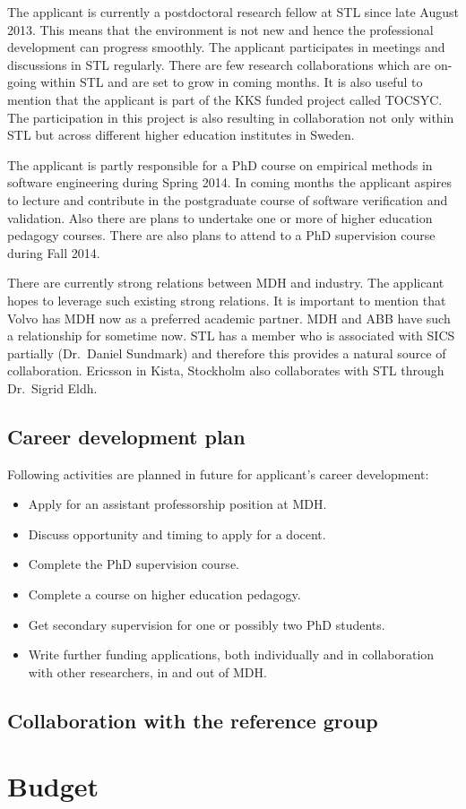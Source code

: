 \documentclass[11pt, oneside]{article}   	%
\begin{document}
The applicant is currently a postdoctoral research fellow at STL since late August 2013. This means that the environment is not new and hence the professional development can progress smoothly. The applicant participates in meetings and discussions in STL regularly. There are few research collaborations which are on-going within STL and are set to grow in coming months. It is also useful to mention that the applicant is part of the KKS funded project called TOCSYC. The participation in this project is also resulting in collaboration not only within STL but across different higher education institutes in Sweden. 

The applicant is partly responsible for a PhD course on empirical methods in software engineering during Spring 2014. In coming months the applicant aspires to lecture and contribute in the postgraduate course of software verification and validation. Also there are plans to undertake one or more of higher education pedagogy courses. There are also plans to attend to a PhD supervision course during Fall 2014. 

There are currently strong relations between MDH and industry. The applicant hopes to leverage such existing strong relations. It is important to mention that Volvo has MDH now as a preferred academic partner. MDH and ABB have such a relationship for sometime now. STL has a member who is associated with SICS partially (Dr.\ Daniel Sundmark) and therefore this provides a natural source of collaboration. Ericsson in Kista, Stockholm also collaborates with STL through Dr.\ Sigrid Eldh. 

\subsection{Career development plan}\label{sec:career_dev_plan} 
Following activities are planned in future for applicant's career development: 
\begin{itemize}
 \item Apply for an assistant professorship position at MDH.
 \item Discuss opportunity and timing to apply for a docent.
 \item Complete the PhD supervision course. 
 \item Complete a course on higher education pedagogy.
 \item Get secondary supervision for one or possibly two PhD students.
 \item Write further funding applications, both individually and in collaboration with other researchers, in and out of MDH.
\end{itemize}

\subsection{Collaboration with the reference group}\label{sec:collab_ref_group}

\section{Budget}\label{sec:budget}

 

\end{document}
